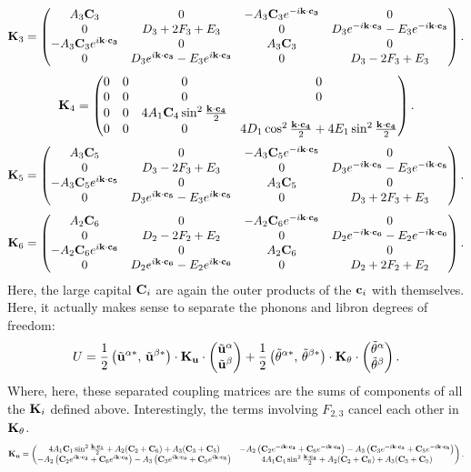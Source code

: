 \documentclass[12pt]{article}
\begin{document}
\[ \mathbf{K}_3 = \left(\begin{matrix}
 A_3\mathbf{C}_3 & 0 & -A_3 \mathbf{C}_3 e^{-i\mathbf{k}\cdot\mathbf{c_3}} & 0 \\
0 & D_3 + 2F_3 + E_3 & 0 & D_3e^{-i\mathbf{k}\cdot\mathbf{c_3}} - 
E_3e^{-i\mathbf{k}\cdot\mathbf{c_3}} \\
-A_3 \mathbf{C}_3 e^{i\mathbf{k}\cdot\mathbf{c_3}} & 0 & A_3 \mathbf{C}_3 & 0  \\
0 &  D_3 e^{i\mathbf{k}\cdot\mathbf{c_3}} - E_3 e^{i\mathbf{k}\cdot\mathbf{c_3}} & 0  & D_3 - 2F_3 + 
E_3\end{matrix}\right).\]
\[ \mathbf{K}_4 = \left(\begin{matrix} 0 & 0 & 0 & 0 \\ 0 & 0 & 0 & 0 \\ 0 & 0 & 4A_1 \mathbf{C}_4
\sin^2 \frac{\mathbf{k}\cdot\mathbf{c_4}}{2}\\ 0 & 0 & 0 & 4D_1 \cos^2\frac{\mathbf{k}\cdot\mathbf{c_4}}{2} + 4E_1 
\sin^2 \frac{\mathbf{k}\cdot\mathbf{c_4}}{2} \end{matrix}\right).\]
\[ \mathbf{K}_5 = \left(\begin{matrix} A_3\mathbf{C}_5 & 0 & -A_3 \mathbf{C}_5 e^{-i\mathbf{k}\cdot\mathbf{c_5}} & 0 \\
0 & D_3 - 2F_3 + E_3 & 0 & D_3e^{-i\mathbf{k}\cdot\mathbf{c_5}} - 
E_3e^{-i\mathbf{k}\cdot\mathbf{c_5}} \\
-A_3 \mathbf{C}_5 e^{i\mathbf{k}\cdot\mathbf{c_5}} & 0 & A_3 \mathbf{C}_5 & 0  \\
0 &  D_3 e^{i\mathbf{k}\cdot\mathbf{c_5}} - E_3 e^{i\mathbf{k}\cdot\mathbf{c_5}} & 0  & D_3 + 2F_3 + 
E_3\end{matrix}\right).\]
\[ \mathbf{K}_6 = \left(\begin{matrix} A_2\mathbf{C}_6 & 0 & -A_2 \mathbf{C}_6 e^{-i\mathbf{k}\cdot\mathbf{c_6}} & 0 \\
0 & D_2 - 2F_2 + E_2 & 0 & D_2e^{-i\mathbf{k}\cdot\mathbf{c_6}} - 
E_2e^{-i\mathbf{k}\cdot\mathbf{c_6}} \\
-A_2 \mathbf{C}_6 e^{i\mathbf{k}\cdot\mathbf{c_6}} & 0 & A_2 \mathbf{C}_6 & 0  \\
0 &  D_2 e^{i\mathbf{k}\cdot\mathbf{c_6}} - E_2 e^{i\mathbf{k}\cdot\mathbf{c_6}} & 0  & D_2 + 2F_2 + 
E_2\end{matrix}\right).\]
Here, the large capital $\mathbf{C}_i$ are again the outer products of the $\mathbf{c}_i$ 
with themselves. Here, it actually makes sense to separate the phonons and 
libron degrees of freedom:
\[ U = \frac{1}{2} \left(\tilde {\mathbf{u}}^{\alpha *}, \, \tilde {\mathbf{u}}^{\beta *}\right)\cdot 
\mathbf{K}_{\mathbf{u}} \cdot \left(\begin{matrix}\tilde {\mathbf{u}}^{\alpha}  \\ \tilde {\mathbf{u}}^{\beta}\end{matrix}\right) + 
\frac{1}{2} \left(\tilde {\theta}^{\alpha *} , \, \tilde {\theta}^{\beta *} \right) \cdot \mathbf{K}_{\theta} 
\cdot \left(\begin{matrix} \tilde {\theta}^\alpha \\ \tilde {\theta}^\beta \end{matrix}\right).\]
Where, here, these separated coupling matrices are the sums of components of 
all the $\mathbf{K}_i$ defined above. Interestingly, the terms involving $F_{2,3}$ 
cancel each other in $\mathbf{K}_\theta$.
\newcommand*{\Scale}[2][4]{\scalebox{#1}{$#2$}}
\[ \Scale[0.8]{\bv K_{\bv u} = \pmtrx{ 4A_1\bv C_1 \sin^2 \half{\Dot{k}{c_1}} 
+ A_2(\bv C_2 + \bv C_6) + A_3 (\bv C_3 + \bv C_5) & -A_2\paren{ \bv C_2 
e^{-i\Dot{k}{c_2}} + \bv C_6 e^{-i\Dot{k}{c_6} }} - A_3\paren{ \bv C_3 
e^{-i\Dot{k}{c_3}} + \bv C_5 e^{-i\Dot{k}{c_5} }} \\ -A_2\paren{ \bv C_2 
e^{i\Dot{k}{c_2}} + \bv C_6 e^{i\Dot{k}{c_6} }} - A_3\paren{ \bv C_3 
e^{i\Dot{k}{c_3}} + \bv C_5 e^{i\Dot{k}{c_5} }} & 4A_1\bv C_4 \sin^2 
\half{\Dot{k}{c_4}} + 
A_2(\bv C_2 + \bv C_6) + A_3 (\bv C_3 + \bv C_5)}.}\]
\end{document}
